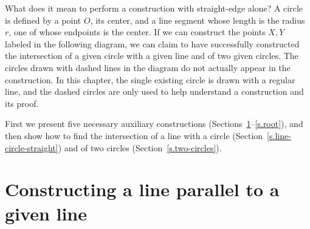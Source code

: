 What does it mean to perform a construction with straight-edge alone? A circle is defined by a point $O$, its center, and a line segment whose length is the radius $r$, one of whose endpoints is the center. If we can construct the points $X,Y$ labeled in the following diagram, we can claim to have successfully constructed the intersection of a given circle with a given line and of two given circles. The circles drawn with dashed lines in the diagram do not actually appear in the construction. In this chapter, the single existing circle is drawn with a regular line, and the dashed circles are only used to help understand a construction and its proof.
\begin{center}
\end{center}

First we present five necessary auxiliary constructions (Sections~\ref{s.parallel}--\ref{s.root}), and then show how to find the intersection of a line with a circle (Section~\ref{s.line-circle-straight}) and of two circles (Section~\ref{s.two-circles}).

\newpage

\section{Constructing a line parallel to a given line}\label{s.parallel}

